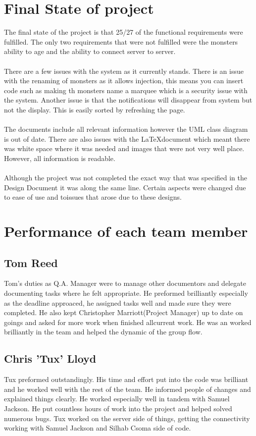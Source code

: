 \documentclass{project}
\begin{document}
\section{Final State of project}
The final state of the project is that 25/27 of the functional requirements were fulfilled. The only two requirements that were not fulfilled were the monsters ability to age and the ability to connect server to server. 
\\\\
There are a few issues with the system as it currently stands. There is an issue with the renaming of monsters as it allows injection, this means you can insert code such as making th monsters name a marquee which is a security issue with the system. Another issue is that the notifications will disappear from system but not the display. This is easily sorted by refreshing the page. 
\\\\
The documents include all relevant information however the UML class diagram is out of date. There are also issues with the \LaTeX document which meant there was white space where it was needed and images that were not very well place. However, all information is readable.
\\\\
Although the project was not completed the exact way that was specified in the Design Document it was along the same line. Certain aspects were changed due to ease of use and toissues that arose due to these designs. 

\section{Performance of each team member}
\subsection{Tom Reed}
Tom's duties as Q.A. Manager were to manage other documentors and delegate documenting tasks where he felt appropriate. He preformed brilliantly especially as the deadline approaced, he assigned tasks well and made sure they were completed. He also kept Christopher Marriott(Project Manager) up to date on goings and asked for more work when finished allcurrent work. He was an worked brilliantly in the team and helped the dynamic of the group flow.  

\subsection{Chris 'Tux' Lloyd}
Tux preformed outstandingly. His time and effort put into the code was brilliant and he worked well with the rest of the team. He informed people of changes and explained things clearly. He worked especially well in tandem with Samuel Jackson. He put countless hours of work into the project and helped solved numerous bugs. Tux worked on the server side of things, getting the connectivity working with Samuel Jackson and Silhab Csoma side of code.
\end{document}
